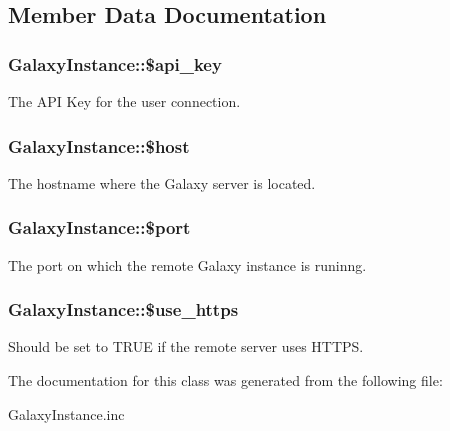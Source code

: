 \subsection{Member Data Documentation}
\hypertarget{classGalaxyInstance_a2a67b0838ca6175e9e01e3045b666caf}{
\subsubsection[{\$api\-\_\-key}]{\setlength{\rightskip}{0pt plus 5cm}Galaxy\-Instance\-::\$api\-\_\-key\hspace{0.3cm}{\ttfamily [protected]}}}\label{classGalaxyInstance_a2a67b0838ca6175e9e01e3045b666caf}
The A\-P\-I Key for the user connection. \hypertarget{classGalaxyInstance_a68aaf747e0eae3b9338cd4c51711b514}{
\subsubsection[{\$host}]{\setlength{\rightskip}{0pt plus 5cm}Galaxy\-Instance\-::\$host\hspace{0.3cm}{\ttfamily [protected]}}}\label{classGalaxyInstance_a68aaf747e0eae3b9338cd4c51711b514}
The hostname where the Galaxy server is located. \hypertarget{classGalaxyInstance_ab70c08b0781f835e1a2e4388b1baa639}{
\subsubsection[{\$port}]{\setlength{\rightskip}{0pt plus 5cm}Galaxy\-Instance\-::\$port\hspace{0.3cm}{\ttfamily [protected]}}}\label{classGalaxyInstance_ab70c08b0781f835e1a2e4388b1baa639}
The port on which the remote Galaxy instance is runinng. \hypertarget{classGalaxyInstance_ab920cbfc8f2f63f3793ba067ee523ca8}{
\subsubsection[{\$use\-\_\-https}]{\setlength{\rightskip}{0pt plus 5cm}Galaxy\-Instance\-::\$use\-\_\-https\hspace{0.3cm}{\ttfamily [protected]}}}\label{classGalaxyInstance_ab920cbfc8f2f63f3793ba067ee523ca8}
Should be set to T\-R\-U\-E if the remote server uses H\-T\-T\-P\-S. 

The documentation for this class was generated from the following file\-:\begin{DoxyCompactItemize}
\item 
Galaxy\-Instance.\-inc\end{DoxyCompactItemize}
